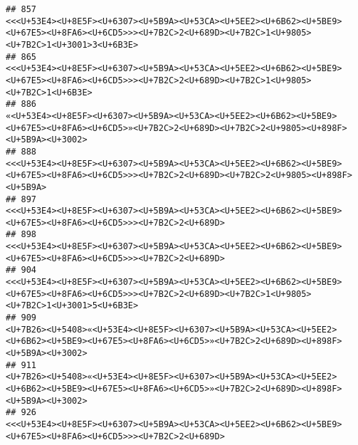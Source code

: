 \documentclass[
]{article}
\begin{document}
\begin{verbatim}
## 857                                                                                                               <<<U+53E4><U+8E5F><U+6307><U+5B9A><U+53CA><U+5EE2><U+6B62><U+5BE9><U+67E5><U+8FA6><U+6CD5>>><U+7B2C>2<U+689D><U+7B2C>1<U+9805><U+7B2C>1<U+3001>3<U+6B3E>
## 865                                                                                                                        <<<U+53E4><U+8E5F><U+6307><U+5B9A><U+53CA><U+5EE2><U+6B62><U+5BE9><U+67E5><U+8FA6><U+6CD5>>><U+7B2C>2<U+689D><U+7B2C>1<U+9805><U+7B2C>1<U+6B3E>
## 886                                                                                                                   «<U+53E4><U+8E5F><U+6307><U+5B9A><U+53CA><U+5EE2><U+6B62><U+5BE9><U+67E5><U+8FA6><U+6CD5>»<U+7B2C>2<U+689D><U+7B2C>2<U+9805><U+898F><U+5B9A><U+3002>
## 888                                                                                                                         <<<U+53E4><U+8E5F><U+6307><U+5B9A><U+53CA><U+5EE2><U+6B62><U+5BE9><U+67E5><U+8FA6><U+6CD5>>><U+7B2C>2<U+689D><U+7B2C>2<U+9805><U+898F><U+5B9A>
## 897                                                                                                                                                          <<<U+53E4><U+8E5F><U+6307><U+5B9A><U+53CA><U+5EE2><U+6B62><U+5BE9><U+67E5><U+8FA6><U+6CD5>>><U+7B2C>2<U+689D>
## 898                                                                                                                                                          <<<U+53E4><U+8E5F><U+6307><U+5B9A><U+53CA><U+5EE2><U+6B62><U+5BE9><U+67E5><U+8FA6><U+6CD5>>><U+7B2C>2<U+689D>
## 904                                                                                                               <<<U+53E4><U+8E5F><U+6307><U+5B9A><U+53CA><U+5EE2><U+6B62><U+5BE9><U+67E5><U+8FA6><U+6CD5>>><U+7B2C>2<U+689D><U+7B2C>1<U+9805><U+7B2C>1<U+3001>5<U+6B3E>
## 909                                                                                                                    <U+7B26><U+5408>«<U+53E4><U+8E5F><U+6307><U+5B9A><U+53CA><U+5EE2><U+6B62><U+5BE9><U+67E5><U+8FA6><U+6CD5>»<U+7B2C>2<U+689D><U+898F><U+5B9A><U+3002>
## 911                                                                                                                    <U+7B26><U+5408>«<U+53E4><U+8E5F><U+6307><U+5B9A><U+53CA><U+5EE2><U+6B62><U+5BE9><U+67E5><U+8FA6><U+6CD5>»<U+7B2C>2<U+689D><U+898F><U+5B9A><U+3002>
## 926                                                                                                                                                          <<<U+53E4><U+8E5F><U+6307><U+5B9A><U+53CA><U+5EE2><U+6B62><U+5BE9><U+67E5><U+8FA6><U+6CD5>>><U+7B2C>2<U+689D>

\end{verbatim}
\end{document}
